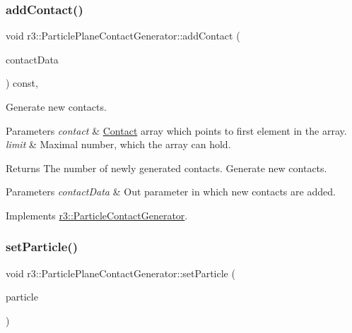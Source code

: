 \subsubsection{\texorpdfstring{add\+Contact()}{addContact()}}
{\footnotesize\ttfamily void r3\+::\+Particle\+Plane\+Contact\+Generator\+::add\+Contact (\begin{DoxyParamCaption}\item[{\mbox{\hyperlink{classr3_1_1_fixed_size_container}{Fixed\+Size\+Container}}$<$ \mbox{\hyperlink{classr3_1_1_particle_contact}{Particle\+Contact}} $>$ \&}]{contact\+Data }\end{DoxyParamCaption}) const\hspace{0.3cm}{\ttfamily [override]}, {\ttfamily [virtual]}}



Generate new contacts. 


\begin{DoxyParams}{Parameters}
{\em contact} & \mbox{\hyperlink{classr3_1_1_contact}{Contact}} array which points to first element in the array. \\
\hline
{\em limit} & Maximal number, which the array can hold. \\
\hline
\end{DoxyParams}
\begin{DoxyReturn}{Returns}
The number of newly generated contacts. Generate new contacts. 
\end{DoxyReturn}

\begin{DoxyParams}{Parameters}
{\em contact\+Data} & Out parameter in which new contacts are added. \\
\hline
\end{DoxyParams}


Implements \mbox{\hyperlink{classr3_1_1_particle_contact_generator_a39a7a8f0d5b31b1ca2c2ace2af8e2978}{r3\+::\+Particle\+Contact\+Generator}}.

\mbox{\label{classr3_1_1_particle_plane_contact_generator_a2df4ea0456118fdd9016e61c56954b2a}} 
\subsubsection{\texorpdfstring{set\+Particle()}{setParticle()}}
{\footnotesize\ttfamily void r3\+::\+Particle\+Plane\+Contact\+Generator\+::set\+Particle (\begin{DoxyParamCaption}\item[{\mbox{\hyperlink{classr3_1_1_particle}{Particle}} $\ast$}]{particle }\end{DoxyParamCaption})}

